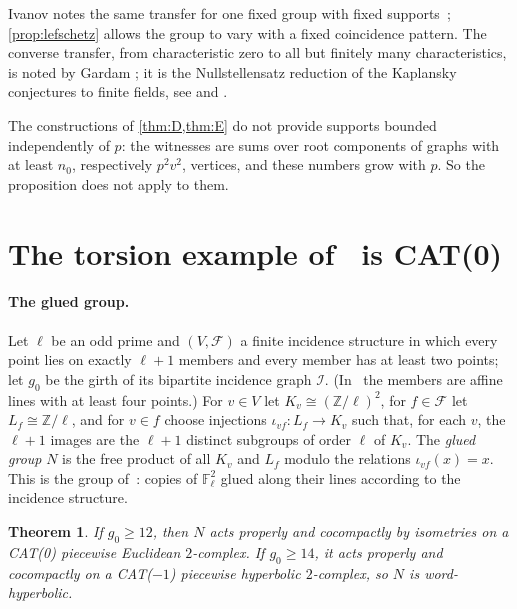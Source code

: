 \documentclass[11pt]{article}
\newtheorem{thm}{Theorem}[section]
\theoremstyle{definition}
\theoremstyle{plain}
\newcommand{\F}{\mathbb{F}}
\newcommand{\Z}{\mathbb{Z}}
\begin{document}
Ivanov notes the same transfer for one fixed group with fixed supports~\cite[\S8.3]{Ivanov2026}; \cref{prop:lefschetz} allows the group to vary with a fixed coincidence pattern. The converse transfer, from characteristic zero to all but finitely many characteristics, is noted by Gardam \cite[Section~1]{Gardam2024}; it is the Nullstellensatz reduction of the Kaplansky conjectures to finite fields, see \cite[Section~1]{BFF2024} and \cite[Section~3.4.3]{Malman2014}.

The constructions of \cref{thm:D,thm:E} do not provide supports bounded independently of $p$: the witnesses are sums over root components of graphs with at least $n_0$, respectively $p^2v^2$, vertices, and these numbers grow with $p$. So the proposition does not apply to them.

\section{The torsion example of~\texorpdfstring{\cite{OAI197b}}{[OAI-197b]} is CAT(0)}\label{sec:cat0}

\paragraph{The glued group.} Let $\ell$ be an odd prime and $(V,\mathcal F)$ a finite incidence structure in which every point lies on exactly $\ell+1$ members and every member has at least two points; let $g_0$ be the girth of its bipartite incidence graph $\mathcal I$. (In~\cite{OAI197b} the members are affine lines with at least four points.) For $v\in V$ let $K_v\cong(\Z/\ell)^2$, for $f\in\mathcal F$ let $L_f\cong\Z/\ell$, and for $v\in f$ choose injections $\iota_{vf}\colon L_f\to K_v$ such that, for each $v$, the $\ell+1$ images are the $\ell+1$ distinct subgroups of order $\ell$ of $K_v$. The \emph{glued group} $N$ is the free product of all $K_v$ and $L_f$ modulo the relations $\iota_{vf}(x)=x$. This is the group of~\cite[\S3.1]{OAI197b}: copies of $\F_\ell^2$ glued along their lines according to the incidence structure.

\begin{thm}\label{thm:cat0}
If $g_0\ge12$, then $N$ acts properly and cocompactly by isometries on a CAT(0) piecewise Euclidean $2$-complex. If $g_0\ge14$, it acts properly and cocompactly on a CAT($-1$) piecewise hyperbolic $2$-complex, so $N$ is word-hyperbolic.
\end{thm}
\end{document}
